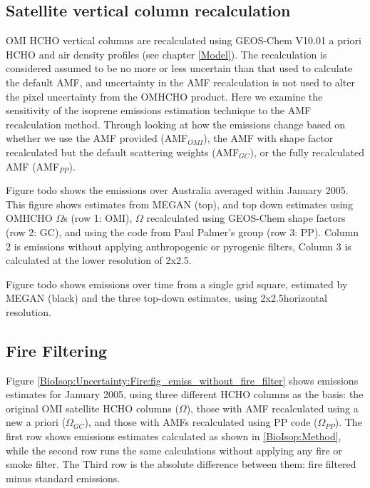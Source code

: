   \subsection{Satellite vertical column recalculation}
    
    OMI HCHO vertical columns are recalculated using GEOS-Chem V10.01 a priori HCHO and air density profiles (see chapter \ref{Model}).
    The recalculation is considered assumed to be no more or less uncertain than that used to calculate the default AMF, and uncertainty in the AMF recalculation is not used to alter the pixel uncertainty from the OMHCHO product.
    Here we examine the sensitivity of the isoprene emissions estimation technique to the AMF recalculation method.
    Through looking at how the emissions change based on whether we use the AMF provided (AMF$_{OMI}$), the AMF with shape factor recalculated but the default scattering weights (AMF$_{GC}$), or the fully recalculated AMF (AMF$_{PP}$).
    
    Figure todo shows the emissions over Australia averaged within January 2005.
    This figure shows estimates from MEGAN (top), and top down estimates using OMHCHO $\Omega$s (row 1: OMI), $\Omega$ recalculated using GEOS-Chem shape factors (row 2: GC), and using the code from Paul Palmer's group (row 3: PP).
    Column 2 is emissions without applying anthropogenic or pyrogenic filters, Column 3 is calculated at the lower resolution of 2x2.5\degr.
    
    Figure todo shows emissions over time from a single grid square, estimated by MEGAN (black) and the three top-down estimates, using 2x2.5\degr horizontal resolution.
  
  \subsection{Fire Filtering}
    
    Figure \ref{BioIsop:Uncertainty:Fire:fig_emiss_without_fire_filter} shows emissions estimates for January 2005, using three different HCHO columns as the basis: the original OMI satellite HCHO columns ($\Omega$), those with AMF recalculated using a new a priori ($\Omega_{GC}$), and those with AMFs recalculated using PP code ($\Omega_{PP}$).
    The first row shows emissions estimates calculated as shown in \ref{BioIsop:Method}, while the second row runs the same calculations without applying any fire or smoke filter.
    The Third row is the absolute difference between them: fire filtered minus standard emissions.
    
